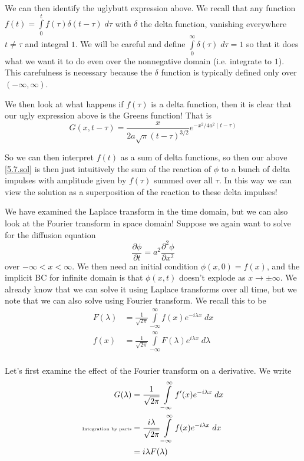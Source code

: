 \documentclass[10pt]{report}
\newcommand{\ptd}[2]{\frac{\partial^2 #1}{\partial#2^2}}
\newcommand{\pd}[2]{\frac{\partial #1}{\partial#2}}
\begin{document}
We can then identify the uglybutt expression above. We recall that any function $f(t) = \int\limits_{0}^{t}f(\tau)\delta(t-\tau)\;d\tau$ with $\delta$ the delta function, vanishing everywhere $t \neq \tau$ and integral $1$. We will be careful and define $\int\limits_{0}^{\infty}\delta(\tau)\;d\tau = 1$ so that it does what we want it to do even over the nonnegative domain (i.e. integrate to $1$). This carefulness is necessary because the $\delta$ function is typically defined only over $(-\infty,\infty)$.

We then look at what happens if $f(\tau)$ is a delta function, then it is clear that our ugly expression above is the Greens function! That is
\begin{equation}
    G(x,t-\tau) = \frac{x}{2a\sqrt{\pi} (t-\tau)^{3/2}}e^{-x^2/4a^2(t-\tau)}
\end{equation}

So we can then interpret $f(t)$ as a sum of delta functions, so then our above \eqref{5.7.sol} is then just intuitively the sum of the reaction of $\phi$ to a bunch of delta impulses with amplitude given by $f(\tau)$ summed over all $\tau$. In this way we can view the solution as a superposition of the reaction to these delta impulses!

We have examined the Laplace transform in the time domain, but we can also look at the Fourier transform in space domain! Suppose we again want to solve for the diffusion equation
\begin{equation}
    \pd{\phi}{t} = a^2 \ptd{\phi}{x}\label{5.7.diffuse}
\end{equation}
over $-\infty < x < \infty$. We then need an initial condition $\phi(x,0) = f(x)$, and the implicit BC for infinite domain is that $\phi(x,t)$ doesn't explode as $x \to \pm \infty$. We already know that we can solve it using Laplace transforms over all time, but we note that we can also solve using Fourier transform. We recall this to be
\begin{align}
    F(\lambda) &= \frac{1}{\sqrt{2\pi}}\int\limits_{-\infty}^{\infty}f(x)e^{-i\lambda x}\;dx\\
    f(x)  &= \frac{1}{\sqrt{2\pi}}\int\limits_{-\infty}^{\infty}F(\lambda)e^{i\lambda x}\;d\lambda\\
\end{align}

Let's first examine the effect of the Fourier transform on a derivative. We write
\begin{align}
    G(\lambda) &= \frac{1}{\sqrt{2\pi}}\int\limits_{-\infty}^{\infty}f'(x)e^{-i\lambda x}\;dx\\
    \text{{\tiny Integration by parts}} &= \frac{i\lambda}{\sqrt{2\pi}}\int\limits_{-\infty}^{\infty}f(x)e^{-i\lambda x}\;dx\\
    &= i\lambda F(\lambda)
\end{align}
\end{document}
